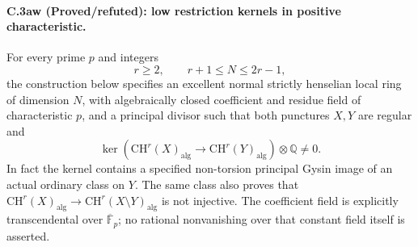 \paragraph{C.3aw (Proved/refuted): low restriction kernels in positive characteristic.}
For every prime $p$ and integers
\[
                        r\ge2,\qquad r+1\le N\le2r-1,
\]
the construction below specifies an excellent normal strictly henselian
local ring of dimension $N$, with algebraically closed coefficient and
residue field of characteristic $p$, and a principal divisor such that
both punctures $X,Y$ are regular and
\[
 \ker\!\left(
  \mathrm{CH}^r(X)_{\mathrm{alg}}\longrightarrow
  \mathrm{CH}^r(Y)_{\mathrm{alg}}\right)\otimes\mathbb Q\ne0.
\]
In fact the kernel contains a specified non-torsion principal Gysin
image of an actual ordinary class on $Y$. The same class also proves
that $\mathrm{CH}^r(X)_{\mathrm{alg}}\to
\mathrm{CH}^r(X\setminus Y)_{\mathrm{alg}}$ is not injective.
The coefficient field is explicitly transcendental over
$\overline{\mathbb F}_p$; no rational nonvanishing over that constant
field itself is asserted.

